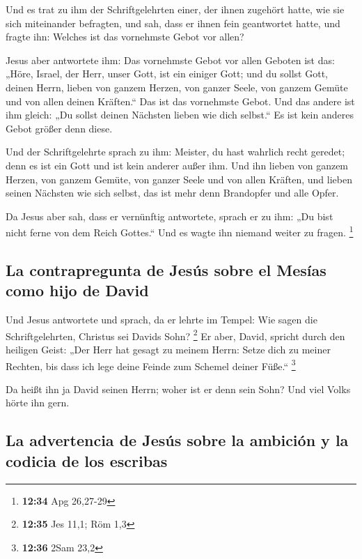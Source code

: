  Und es trat zu ihm der Schriftgelehrten einer, der ihnen
zugehört hatte, wie sie sich miteinander befragten, und sah, dass er
ihnen fein geantwortet hatte, und fragte ihn: Welches ist das vornehmste
Gebot vor allen?

 Jesus aber antwortete ihm: Das vornehmste Gebot vor
allen Geboten ist das: „Höre, Israel, der Herr, unser Gott, ist ein
einiger Gott;  und du sollst Gott, deinen Herrn, lieben
von ganzem Herzen, von ganzer Seele, von ganzem Gemüte und von allen
deinen Kräften.`` Das ist das vornehmste Gebot.  Und das
andere ist ihm gleich: „Du sollst deinen Nächsten lieben wie dich
selbst.`` Es ist kein anderes Gebot größer denn diese.

 Und der Schriftgelehrte sprach zu ihm: Meister, du hast
wahrlich recht geredet; denn es ist ein Gott und ist kein anderer außer
ihm.  Und ihn lieben von ganzem Herzen, von ganzem
Gemüte, von ganzer Seele und von allen Kräften, und lieben seinen
Nächsten wie sich selbst, das ist mehr denn Brandopfer und alle Opfer.

 Da Jesus aber sah, dass er vernünftig antwortete, sprach
er zu ihm: „Du bist nicht ferne von dem Reich Gottes.`` Und es wagte ihn
niemand weiter zu fragen. \footnote{\textbf{12:34} Apg 26,27-29}

\hypertarget{la-contrapregunta-de-jesuxfas-sobre-el-mesuxedas-como-hijo-de-david}{%
\subsection{La contrapregunta de Jesús sobre el Mesías como hijo de
David}\label{la-contrapregunta-de-jesuxfas-sobre-el-mesuxedas-como-hijo-de-david}}

 Und Jesus antwortete und sprach, da er lehrte im Tempel:
Wie sagen die Schriftgelehrten, Christus sei Davids Sohn? \footnote{\textbf{12:35}
  Jes 11,1; Röm 1,3}  Er aber, David, spricht durch den
heiligen Geist: „Der Herr hat gesagt zu meinem Herrn: Setze dich zu
meiner Rechten, bis dass ich lege deine Feinde zum Schemel deiner
Füße.`` \footnote{\textbf{12:36} 2Sam 23,2}

 Da heißt ihn ja David seinen Herrn; woher ist er denn
sein Sohn? Und viel Volks hörte ihn gern.

\hypertarget{la-advertencia-de-jesuxfas-sobre-la-ambiciuxf3n-y-la-codicia-de-los-escribas}{%
\subsection{La advertencia de Jesús sobre la ambición y la codicia de
los
escribas}\label{la-advertencia-de-jesuxfas-sobre-la-ambiciuxf3n-y-la-codicia-de-los-escribas}}

